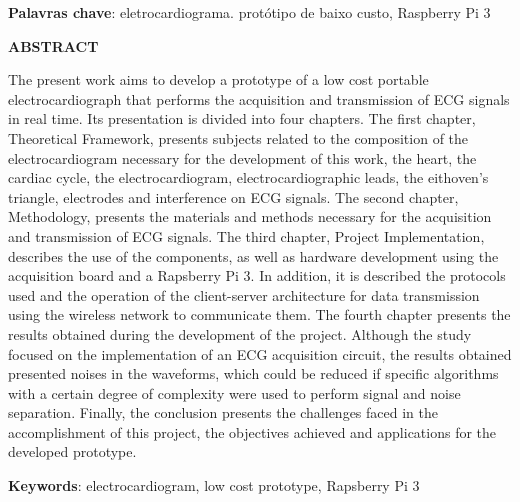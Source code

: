 \documentclass[12pt, a4paper]{article}
\begin{document}
\textbf{Palavras chave}: eletrocardiograma. protótipo de baixo custo, Raspberry Pi 3

\newpage
\thispagestyle{empty}
\vspace*{4.4cm}
{\begin{center}\textbf{\normalsize ABSTRACT}\vspace{36pt}\end{center}}
The present work aims to develop a prototype of a low cost portable electrocardiograph that performs the acquisition and transmission of ECG signals in real time. Its presentation is divided into four chapters. The first chapter, Theoretical Framework, presents subjects related to the composition of the electrocardiogram necessary for the development of this work, the heart, the cardiac cycle, the electrocardiogram, electrocardiographic leads, the eithoven’s triangle, electrodes and interference on ECG signals. The second chapter, Methodology, presents the materials and methods necessary for the acquisition and transmission of ECG signals. The third chapter, Project Implementation, describes the use of the components, as well as hardware development using the acquisition board and a Rapsberry Pi 3. In addition, it is described the protocols used and the operation of the client-server architecture for data transmission using the wireless network to communicate them. The fourth chapter presents the results obtained during the development of the project. Although the study focused on the implementation of an ECG acquisition circuit, the results obtained presented noises in the waveforms, which could be reduced if specific algorithms with a certain degree of complexity were used to perform signal and noise separation. Finally, the conclusion presents the challenges faced in the accomplishment of this project, the objectives achieved and applications for the developed prototype.


\textbf{Keywords}: electrocardiogram, low cost prototype, Rapsberry Pi 3



\newpage
\pagestyle{empty}
\listoffigures
\clearpage




\newpage
\pagestyle{empty}
\renewcommand{\contentsname}{\begin{center}\textbf{\normalsize SUMÁRIO}\vspace{36pt}\end{center}}
\tableofcontents
\clearpage
\end{document}
